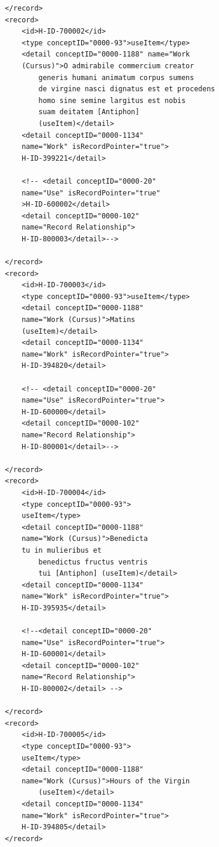 \documentclass[a4paper,12pt,twoside]{book}
\begin{document}
\begin{verbatim}
        </record>
        <record>
            <id>H-ID-700002</id>
            <type conceptID="0000-93">useItem</type>
            <detail conceptID="0000-1188" name="Work 
            (Cursus)">O admirabile commercium creator
                generis humani animatum corpus sumens 
                de virgine nasci dignatus est et procedens
                homo sine semine largitus est nobis 
                suam deitatem [Antiphon] 
                (useItem)</detail>
            <detail conceptID="0000-1134" 
            name="Work" isRecordPointer="true">
            H-ID-399221</detail>

            <!-- <detail conceptID="0000-20" 
            name="Use" isRecordPointer="true"
            >H-ID-600002</detail>
            <detail conceptID="0000-102" 
            name="Record Relationship">
            H-ID-800003</detail>-->

        </record>
        <record>
            <id>H-ID-700003</id>
            <type conceptID="0000-93">useItem</type>
            <detail conceptID="0000-1188" 
            name="Work (Cursus)">Matins 
            (useItem)</detail>
            <detail conceptID="0000-1134"
            name="Work" isRecordPointer="true">
            H-ID-394820</detail>

            <!-- <detail conceptID="0000-20"
            name="Use" isRecordPointer="true">
            H-ID-600000</detail>
            <detail conceptID="0000-102" 
            name="Record Relationship">
            H-ID-800001</detail>-->

        </record>
        <record>
            <id>H-ID-700004</id>
            <type conceptID="0000-93">
            useItem</type>
            <detail conceptID="0000-1188" 
            name="Work (Cursus)">Benedicta
            tu in mulieribus et
                benedictus fructus ventris 
                tui [Antiphon] (useItem)</detail>
            <detail conceptID="0000-1134" 
            name="Work" isRecordPointer="true">
            H-ID-395935</detail>

            <!--<detail conceptID="0000-20" 
            name="Use" isRecordPointer="true">
            H-ID-600001</detail>
            <detail conceptID="0000-102" 
            name="Record Relationship">
            H-ID-800002</detail> -->

        </record>
        <record>
            <id>H-ID-700005</id>
            <type conceptID="0000-93">
            useItem</type>
            <detail conceptID="0000-1188"
            name="Work (Cursus)">Hours of the Virgin
                (useItem)</detail>
            <detail conceptID="0000-1134" 
            name="Work" isRecordPointer="true">
            H-ID-394805</detail>
        </record>


\end{verbatim}
\end{document}
